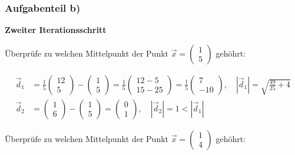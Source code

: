 \documentclass[11pt]{article}
\begin{document}
    \hypertarget{aufgabenteil-b}{%
\subsubsection{Aufgabenteil b)}\label{aufgabenteil-b}}

\textbf{Zweiter Iterationsschritt}

Überprüfe zu welchen Mittelpunkt der Punkt
\(\vec{x} = \begin{pmatrix} 1 \\ 5 \end{pmatrix}\) gehöhrt:

\[\begin{aligned}
\vec{d}_1 &= \frac{1}{5}\begin{pmatrix} 12 \\ 5 \end{pmatrix} -  \begin{pmatrix} 1 \\ 5 \end{pmatrix} =  \frac{1}{5} \begin{pmatrix} 12 -5 \\ 15 - 25  \end{pmatrix} = \frac{1}{5}\begin{pmatrix} 7 \\ -10 \end{pmatrix}, \quad \left| \vec{d}_1 \right| = \sqrt{\frac{49}{25} + 4}  \\
\vec{d}_2 &= \begin{pmatrix} 1 \\ 6 \end{pmatrix} -  \begin{pmatrix} 1 \\ 5 \end{pmatrix} =  \begin{pmatrix} 0 \\ 1 \end{pmatrix}, \quad \left| \vec{d}_2 \right| = 1 < \left| \vec{d}_1 \right|
\end{aligned}\]

Überprüfe zu welchen Mittelpunkt der Punkt
\(\vec{x} = \begin{pmatrix} 1 \\ 4 \end{pmatrix}\) gehöhrt:
\end{document}
